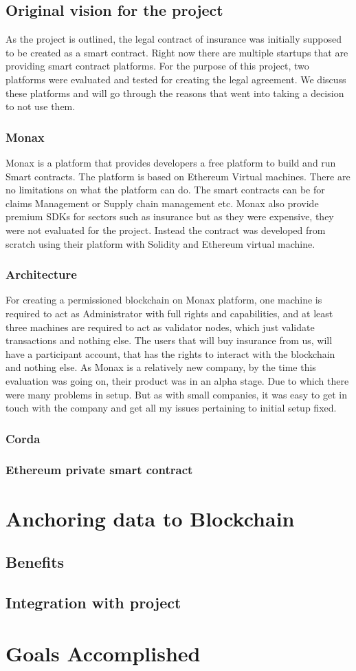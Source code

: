 \subsection{Original vision for the project}
As the project is outlined, the legal contract of insurance was initially supposed to be created as a smart contract. Right now there are multiple startups that are providing smart contract platforms. For the purpose of this project, two platforms were evaluated and tested for creating the legal agreement. We discuss these platforms and will go through the reasons that went into taking a decision to not use them. 

\subsubsection{Monax}
Monax is a platform that provides developers a free platform to build and run Smart contracts. The platform is based on Ethereum Virtual machines. There are no limitations on what the platform can do. The smart contracts can be for claims Management or Supply chain management etc. Monax also provide premium SDKs for sectors such as insurance but as they were expensive, they were not evaluated for the project. Instead the contract was developed from scratch using their platform with Solidity and Ethereum virtual machine. 
\subsubsection{Architecture}
For creating a permissioned blockchain on Monax platform, one machine is  required to act as Administrator with full rights and capabilities, and at least three machines are required to act as validator nodes, which just validate transactions and nothing else. The users that will buy insurance from us, will have a participant account, that has the rights to interact with the blockchain and nothing else.
As Monax is a relatively new company, by the time this evaluation was going on, their product was in an alpha stage. Due to which there were many problems in setup. But as with small companies, it was easy to get in touch with the company and get all my issues pertaining to initial setup fixed. 
\\
\subsubsection{Corda}
\subsubsection{Ethereum private smart contract}

\section{Anchoring data to Blockchain}
\subsection{Benefits}
\subsection{Integration with project}

\section{Goals Accomplished}

